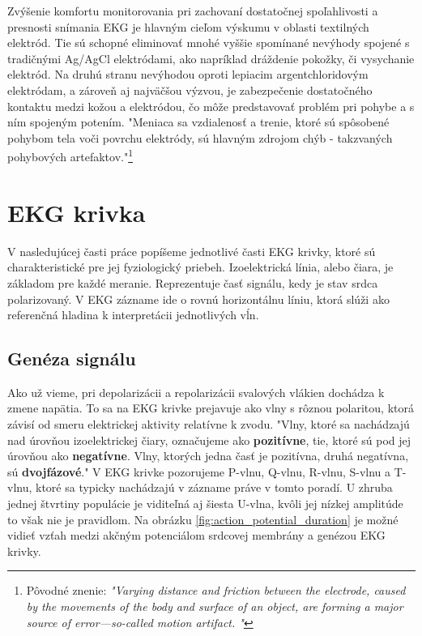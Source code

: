 Zvýšenie komfortu monitorovania pri zachovaní dostatočnej spoľahlivosti a presnosti snímania EKG je hlavným cieľom výskumu v oblasti textilných elektród. Tie sú schopné eliminovať mnohé vyššie spomínané nevýhody spojené s tradičnými Ag/AgCl elektródami, ako napríklad dráždenie pokožky, či vysychanie elektród.\cite{Arquilla2020} Na druhú stranu nevýhodou oproti lepiacim argentchloridovým elektródam, a zároveň aj najväčšou výzvou, je zabezpečenie dostatočného kontaktu medzi kožou a elektródou, čo môže predstavovať problém pri pohybe a s ním spojeným potením. "Meniaca sa vzdialenosť a trenie, ktoré sú spôsobené pohybom tela voči povrchu elektródy, sú hlavným zdrojom chýb - takzvaných pohybových artefaktov."\footnote{Pôvodné znenie: \textit{"Varying distance and friction between the electrode, caused by the movements of the body and surface of an object, are forming a major source of error—so-called motion artifact. "}}\cite{Metshein2021}


\section{EKG krivka}

V nasledujúcej časti práce popíšeme jednotlivé časti EKG krivky, ktoré sú charakteristické pre jej fyziologický priebeh. Izoelektrická línia, alebo čiara, je základom pre každé meranie. Reprezentuje časť signálu, kedy je stav srdca polarizovaný. V EKG zázname ide o rovnú horizontálnu líniu, ktorá slúži ako referenčná hladina k interpretácii jednotlivých vĺn.

\subsection{Genéza signálu}

Ako už vieme, pri depolarizácii a repolarizácii svalových vlákien dochádza k zmene napätia. To sa na EKG krivke prejavuje ako vlny s rôznou polaritou, ktorá závisí od smeru elektrickej aktivity relatívne k zvodu. "Vlny, ktoré sa nachádzajú nad úrovňou izoelektrickej čiary, označujeme ako \textbf{pozitívne}, tie, ktoré sú pod jej úrovňou ako \textbf{negatívne}. Vlny, ktorých jedna časť je pozitívna, druhá negatívna, sú \textbf{dvojfázové}."\cite{Bada2010} V EKG krivke pozorujeme P-vlnu, Q-vlnu, R-vlnu, S-vlnu a T-vlnu, ktoré sa typicky nachádzajú v zázname práve v tomto poradí. U zhruba jednej štvrtiny populácie je viditeľná aj šiesta U-vlna, kvôli jej nízkej amplitúde to však nie je pravidlom.\cite{Wasilewski2011} Na obrázku \ref{fig:action_potential_duration} je možné vidieť vzťah medzi akčným potenciálom srdcovej membrány a genézou EKG krivky.

